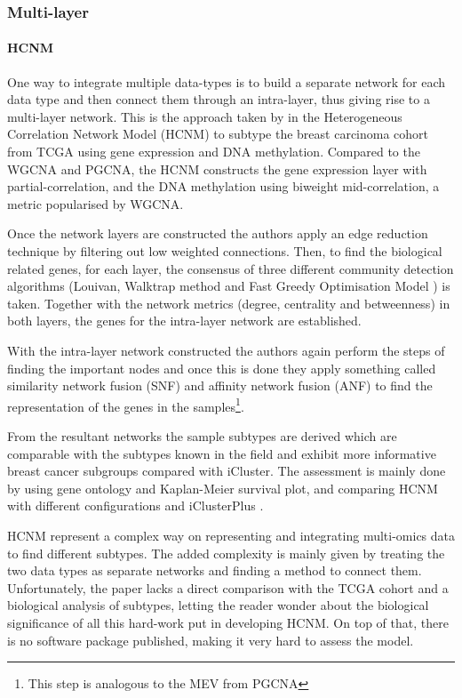 \subsubsection{Multi-layer} \label{s:lit:multi-layer}
\paragraph*{HCNM} \label{s:lit:HCNM}

One way to integrate multiple data-types is to build a separate network for each data type and then connect them through an intra-layer, thus giving rise to a multi-layer network. This is the approach taken by \citet{Vangimalla2021-fc} in the Heterogeneous Correlation Network Model (HCNM) to subtype the breast carcinoma cohort from TCGA using gene expression and DNA methylation. Compared to the WGCNA and PGCNA, the HCNM constructs the gene expression layer with partial-correlation, and the DNA methylation using biweight mid-correlation, a metric popularised by WGCNA. 

Once the network layers are constructed the authors apply an edge reduction technique by filtering out low weighted connections. Then, to find the biological related genes, for each layer, the consensus of three different community detection algorithms (Louivan\cite{Blondel2008-ik}, Walktrap method \citet{Pons2005-oa} and Fast Greedy Optimisation Model \citet{Clauset2004-em}) is taken. Together with the network metrics (degree, centrality and betweenness) in both layers, the genes for the intra-layer network are established.

With the intra-layer network constructed the authors again perform the steps of finding the important nodes and once this is done they apply something called similarity network fusion (SNF) and affinity network fusion (ANF) to find the representation of the genes in the samples\footnote{This step is analogous to the MEV from PGCNA}. 

From the resultant networks the sample subtypes are derived which are comparable with the subtypes known in the field and exhibit more informative breast cancer subgroups compared with iCluster. The assessment is mainly done by using gene ontology and Kaplan-Meier survival plot, and comparing HCNM with different configurations and iClusterPlus \citet{Mo2013-zi}. 

HCNM represent a complex way on representing and integrating multi-omics data to find different subtypes. The added complexity is mainly given by treating the two data types as separate networks and finding a method to connect them. Unfortunately, the paper lacks a direct comparison with the TCGA cohort and a biological analysis of subtypes, letting the reader wonder about the biological significance of all this hard-work put in developing HCNM. On top of that, there is no software package published, making it very hard to assess the model. 

